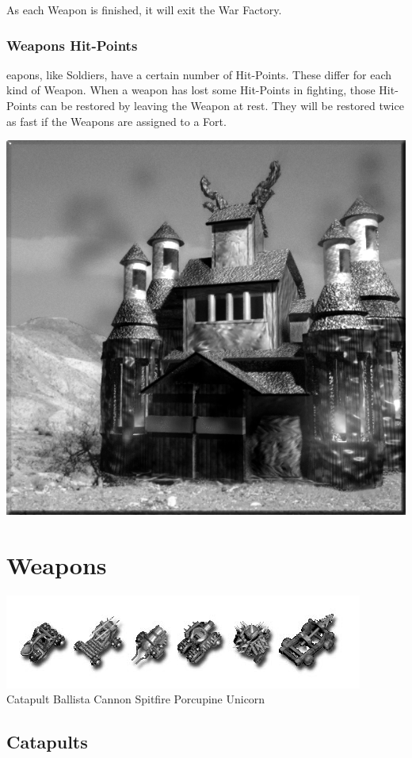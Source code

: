 As each Weapon is finished, it will exit the War Factory.

\subsubsection{Weapons Hit-Points}

eapons, like Soldiers, have a certain number of Hit-Points. These differ for each kind of Weapon. When a weapon has lost some Hit-Points in fighting, those Hit-Points can be restored by leaving the Weapon at rest. They will be restored twice as fast if the Weapons are assigned to a Fort.

\begin{center}
	\includegraphics[width=0.7\linewidth]{Awarfactory}
\end{center}

\section{Weapons}

\begin{center}
	\includegraphics[width=0.7\linewidth]{Iweapons}
	\\ Catapult Ballista Cannon Spitfire Porcupine Unicorn
\end{center}

\clearpage

\subsection{Catapults}

